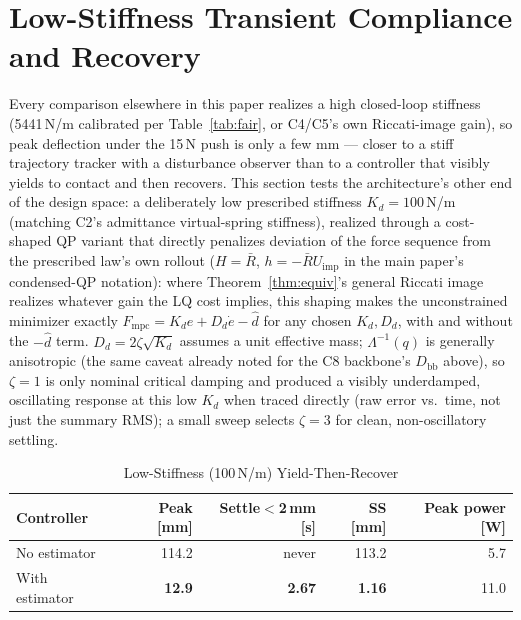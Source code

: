 \documentclass[journal]{IEEEtran}
\newcommand{\Laminv}{\Lambda^{-1}(q)}
\newcommand{\Fmpc}{F_{\text{mpc}}}
\begin{document}
\section{Low-Stiffness Transient Compliance and Recovery}\label{sec:lowk}

Every comparison elsewhere in this paper realizes a high closed-loop
stiffness (5441\,N/m calibrated per Table~\ref{tab:fair}, or C4/C5's own
Riccati-image gain), so peak deflection under the 15\,N push is only a
few mm --- closer to a stiff trajectory tracker with a disturbance
observer than to a controller that visibly yields to contact and then
recovers. This section tests the architecture's other end of the design
space: a deliberately low prescribed stiffness $K_d=100$\,N/m (matching
C2's admittance virtual-spring stiffness), realized through a
cost-shaped QP variant that directly penalizes deviation of the force
sequence from the prescribed law's own rollout ($H=\bar R$,
$h=-\bar RU_\text{imp}$ in the main paper's condensed-QP notation):
where Theorem~\ref{thm:equiv}'s general Riccati image realizes whatever
gain the LQ cost implies, this shaping makes the
unconstrained minimizer exactly $\Fmpc=K_de+D_d\dot e-\hat d$ for any
chosen $K_d,D_d$, with and without the $-\hat d$ term. $D_d=2\zeta\sqrt{K_d}$ assumes a unit
effective mass; $\Laminv$ is generally anisotropic (the same caveat
already noted for the C8 backbone's $D_\text{bb}$ above), so $\zeta=1$ is
only nominal critical damping and produced a visibly underdamped,
oscillating response at this low $K_d$ when traced directly (raw error
vs.\ time, not just the summary RMS); a small sweep selects $\zeta=3$ for
clean, non-oscillatory settling.

\begin{table}[!t]
\caption{Low-Stiffness (100\,N/m) Yield-Then-Recover}
\label{tab:lowk}
\renewcommand{\arraystretch}{1.0}
\footnotesize
\setlength{\tabcolsep}{3.5pt}
\begin{tabular}{lrrrr}
\toprule
\textbf{Controller} & \textbf{Peak [mm]} & \textbf{Settle$<$2\,mm [s]} & \textbf{SS [mm]} & \textbf{Peak power [W]}\\
\midrule
No estimator   & 114.2         & never          & 113.2         & 5.7\\
With estimator & \textbf{12.9} & \textbf{2.67}  & \textbf{1.16} & 11.0\\
\bottomrule
\end{tabular}
\end{table}
\end{document}
